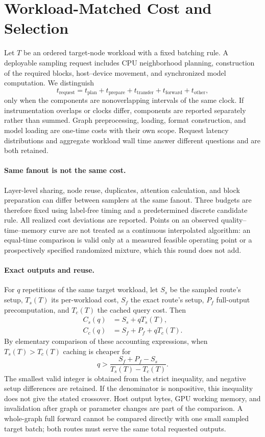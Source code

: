 \section{Workload-Matched Cost and Selection}
\label{sec:cost}
Let $T$ be an ordered target-node workload with a fixed batching rule. A deployable sampling request includes CPU neighborhood planning, construction of the required blocks, host--device movement, and synchronized model computation. We distinguish
\begin{equation}
t_{\mathrm{request}}=t_{\mathrm{plan}}+t_{\mathrm{prepare}}+t_{\mathrm{transfer}}+t_{\mathrm{forward}}+t_{\mathrm{other}},
\end{equation}
only when the components are nonoverlapping intervals of the same clock. If instrumentation overlaps or clocks differ, components are reported separately rather than summed. Graph preprocessing, loading, format construction, and model loading are one-time costs with their own scope. Request latency distributions and aggregate workload wall time answer different questions and are both retained.

\paragraph{Same fanout is not the same cost.}
Layer-level sharing, node reuse, duplicates, attention calculation, and block preparation can differ between samplers at the same fanout. Three budgets are therefore fixed using label-free timing and a predetermined discrete candidate rule. All realized cost deviations are reported. Points on an observed quality--time--memory curve are not treated as a continuous interpolated algorithm: an equal-time comparison is valid only at a measured feasible operating point or a prospectively specified randomized mixture, which this round does not add.

\paragraph{Exact outputs and reuse.}
For $q$ repetitions of the same target workload, let $S_s$ be the sampled route's setup, $T_s(T)$ its per-workload cost, $S_f$ the exact route's setup, $P_f$ full-output precomputation, and $T_c(T)$ the cached query cost. Then
\begin{align}
C_s(q)&=S_s+qT_s(T),\\
C_c(q)&=S_f+P_f+qT_c(T).
\label{eq:cache}
\end{align}
By elementary comparison of these accounting expressions, when $T_s(T)>T_c(T)$ caching is cheaper for
\begin{equation}
q>\frac{S_f+P_f-S_s}{T_s(T)-T_c(T)}.
\label{eq:breakeven}
\end{equation}
The smallest valid integer is obtained from the strict inequality, and negative setup differences are retained. If the denominator is nonpositive, this inequality does not give the stated crossover. Host output bytes, GPU working memory, and invalidation after graph or parameter changes are part of the comparison. A whole-graph full forward cannot be compared directly with one small sampled target batch; both routes must serve the same total requested outputs.


